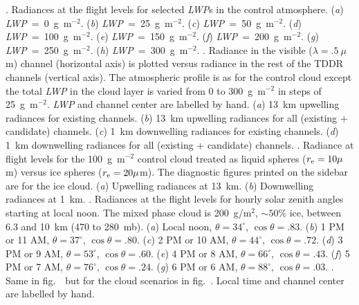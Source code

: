%
\bigskip
\vbox{
.
Radiances at the flight levels for selected {\it LWP}\/s in the
control atmosphere.
({\it a\/}) {\it LWP\/}~=~0~g~m$^{-2}$.
({\it b\/}) {\it LWP\/}~=~25~g~m$^{-2}$.
({\it c\/}) {\it LWP\/}~=~50~g~m$^{-2}$.
({\it d\/}) {\it LWP\/}~=~100~g~m$^{-2}$.
({\it e\/}) {\it LWP\/}~=~150~g~m$^{-2}$.
({\it f\/}) {\it LWP\/}~=~200~g~m$^{-2}$.
({\it g\/}) {\it LWP\/}~=~250~g~m$^{-2}$.
({\it h\/}) {\it LWP\/}~=~300~g~m$^{-2}$.
}
%
\bigskip
\vbox{
.
Radiance in the visible ($\lambda = .5~\mu$m) channel (horizontal
axis) is plotted versus radiance in the rest of the TDDR channels
(vertical axis). 
The atmospheric profile is as for the control cloud
except the total {\it LWP\/} in the cloud layer is varied from 0 to
300~g~m$^{-2}$ in steps of 25~g~m$^{-2}$.
{\it LWP\/} and channel center are labelled by hand.
({\it a\/}) 13~km upwelling radiances for existing channels.
({\it b\/}) 13~km upwelling radiances for all (existing + candidate) channels.
({\it c\/}) 1~km downwelling radiances for existing channels.
({\it d\/}) 1~km downwelling radiances for all (existing + candidate) channels.
}
%
\bigskip
\vbox{
.
Radiance at flight levels for the 100~g~m$^{-2}$ control cloud
treated as liquid spheres ($r_{\rm e} = 10 \mu$m) versus ice spheres
($r_{\rm e} = 20 \mu$m). 
The diagnostic figures printed on the sidebar are for the ice cloud.
({\it a\/}) Upwelling radiances at 13~km.
({\it b\/}) Downwelling radiances at 1~km.
}
%
\bigskip
\vbox{
.
Radiances at the flight levels for hourly solar zenith angles
starting at local noon. 
The mixed phase cloud is 200~g/m$^2$, $\sim 50$\% ice, between 
6.3 and 10~km (470 to 280~mb).
({\it a\/}) Local noon, $\theta = 34^\circ$, $\cos\theta = .83$.
({\it b\/}) 1 PM or 11 AM, $\theta = 37^\circ$, $\cos\theta = .80$.
({\it c\/}) 2 PM or 10 AM, $\theta = 44^\circ$, $\cos\theta = .72$.
({\it d\/}) 3 PM or 9 AM, $\theta = 53^\circ$, $\cos\theta = .60$.
({\it e\/}) 4 PM or 8 AM, $\theta = 66^\circ$, $\cos\theta = .43$.
({\it f\/}) 5 PM or 7 AM, $\theta = 76^\circ$, $\cos\theta = .24$.
({\it g\/}) 6 PM or 6 AM, $\theta = 88^\circ$, $\cos\theta = .03$.
}
%
\bigskip
\vbox{
.
Same in fig.~\ but for the cloud scenarios in 
fig.~.
Local time and channel center are labelled by hand.
}
%
%
\baselineskip=14pt
\tenrm
\vfill\eject

